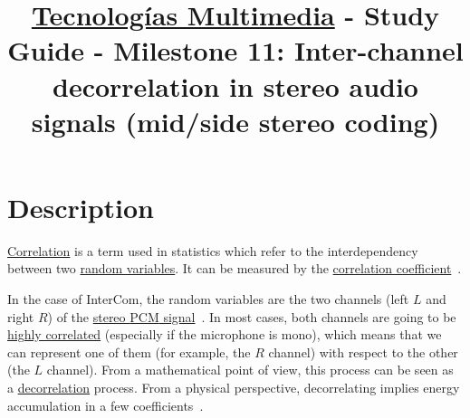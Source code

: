 \title{\href{https://www.ual.es/estudios/grados/presentacion/plandeestudios/asignatura/4015/40154321?idioma=zh_CN}{Tecnologías Multimedia} - Study Guide - Milestone 11: Inter-channel decorrelation in stereo audio signals (mid/side stereo coding)}

\maketitle

\section{Description}

\href{https://en.wikipedia.org/wiki/Correlation_and_dependence}{Correlation}
is a term used in statistics which refer to the interdependency
between two \href{https://en.wikipedia.org/wiki/Random_variable}{random
  variables}. It can be measured by the
\href{https://www.mathsisfun.com/data/correlation.html}{correlation
  coefficient}~\cite{thinkstats}.

In the case of InterCom, the random variables are the two channels
(left $L$ and right $R$) of the
\href{https://en.wikipedia.org/wiki/Stereophonic_sound}{stereo
  \href{https://en.wikipedia.org/wiki/Pulse-code_modulation}{PCM}
  signal}~\cite{bosi2003intro}. In most cases, both channels are going
to be \href{https://en.wikipedia.org/wiki/Binaural_recording}{highly
  correlated} (especially if the microphone is mono), which means that
we can represent one of them (for example, the $R$ channel) with
respect to the other (the $L$ channel). From a mathematical point of
view, this process can be seen as a
\href{https://en.wikipedia.org/wiki/Decorrelation}{decorrelation}
process. From a physical perspective, decorrelating implies energy
accumulation in a few coefficients~\cite{sayood2017introduction}.

